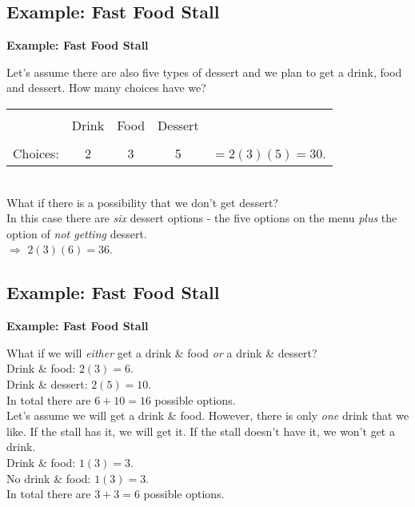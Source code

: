 \documentclass[compress]{beamer}        %
\makeatletter
\newcommand{\tcb}{\textcolor{beamer@blendedblue}}
\makeatother
\begin{document}
\subsection{Example: Fast Food Stall}
\begin{frame}{\bf \tcb{Example: Fast Food Stall}}

Let's assume there are also five types of dessert and we plan to get a drink, food and dessert. How many choices have we?\\[0.3cm]

\begin{tabular}{l|c|c|c|c}
\cline{2-4}
&&&&\\[-0.4cm]
&Drink & Food & Dessert & \\
\cline{2-4}
&&&&\\[-0.4cm]
Choices: & 2 & 3 & 5 & $= 2(3)(5) = 30$. \\
\cline{2-4}
\end{tabular}\\[1cm]


What if there is a possibility that we don't get dessert?\\[0.3cm]

In this case there are \emph{six} dessert options - the five options on the menu \emph{plus} the option of \emph{not getting} dessert.\\[0.3cm]

$\Rightarrow$ $2(3)(6) = 36$.

\end{frame}


\subsection{Example: Fast Food Stall}
\begin{frame}{\bf \tcb{Example: Fast Food Stall}}

What if we will \emph{either} get a drink \& food \emph{or} a drink \& dessert?\\[0.3cm]

Drink \& food: $2(3) = 6$.\\
Drink \& dessert: $2(5) = 10$.\\[0.2cm]
In total there are $6 + 10 = 16$ possible options.\\[1cm]

Let's assume we will get a drink \& food. However, there is only \emph{one} drink that we like. If the stall has it, we will get it. If the stall doesn't have it, we won't get a drink.\\[0.3cm]

Drink \& food: $1(3) = 3$.\\
No drink \& food: $1(3) = 3$.\\[0.2cm]
In total there are $3 + 3 = 6$ possible options.\\[0.3cm]


\end{frame}
\end{document}

